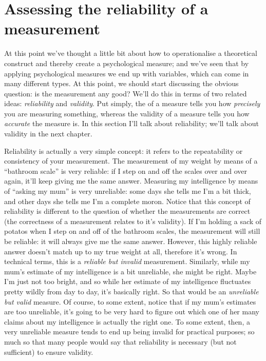 \section{Assessing the reliability of a measurement~\label{sec:reliability}}

At this point we've thought a little bit about how to operationalise a theoretical construct and thereby create a psychological measure; and we've seen that by applying psychological measures we end up with variables, which can come in many different types. At this point, we should start discussing the obvious question: is the measurement any good? We'll do this in terms of two related ideas: {\it reliability} and {\it validity}. Put simply, the  of a measure tells you how {\it precisely} you are measuring something, whereas the validity of a measure tells you how {\it accurate} the measure is. In this section I'll talk about reliability; we'll talk about validity in the next chapter. 

Reliability is actually a very simple concept: it refers to the repeatability or consistency of your measurement. The measurement of my weight by means of a ``bathroom scale'' is very reliable: if I step on and off the scales over and over again, it'll keep giving me the same answer. Measuring my intelligence by means of ``asking my mum'' is very unreliable: some days she tells me I'm a bit thick, and other days she tells me I'm a complete moron. Notice that this concept of reliability is different to the question of whether the measurements are correct (the correctness of a measurement relates to it's validity). If I'm holding a sack of potatos when I step on and off of the bathroom scales, the measurement will still be reliable: it will always give me the same answer. However, this highly reliable answer doesn't match up to my true weight at all, therefore it's wrong. In technical terms, this is a {\it reliable but invalid} measurement. Similarly, while my mum's estimate of my intelligence is a bit unreliable, she might be right. Maybe I'm just not too bright, and so while her estimate of my intelligence fluctuates pretty wildly from day to day, it's basically right. So that would be an {\it unreliable but valid} measure. Of course, to some extent, notice that if my mum's estimates are too unreliable, it's going to be very hard to figure out which one of her many claims about my intelligence is actually the right one. To some extent, then, a very unreliable measure tends to end up being invalid for practical purposes; so much so that many people would say that reliability is necessary (but not sufficient) to ensure validity. 



